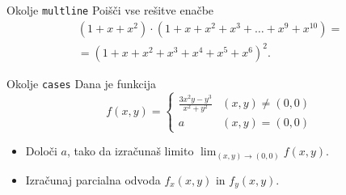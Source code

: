\begin{frame}{Okolje \texttt{multline}}
	Poišči vse rešitve enačbe
	\begin{multline*}
	(1+x+x^2) \cdot (1+x+x^2+x^3+\ldots+x^9+x^{10}) = \\
	=(1+x+x^2+x^3+x^4+x^5+x^6)^2.
	\end{multline*}
\end{frame}

\begin{frame}{Okolje \texttt{cases}}
	Dana je funkcija
	\[
	f(x,y)=\begin{cases}
		\frac{3x^2y-y^3}{x^2+y^2} & (x,y) \neq (0,0)\\
		a & (x,y) = (0,0)
	\end{cases}
	\]	
	\begin{itemize}
	\item Določi $a$, tako da izračunaš limito \( \displaystyle \lim_{(x,y)\to(0,0)} f(x,y). \)
	\item Izračunaj parcialna odvoda $f_x(x,y)$ in $f_y(x,y)$.
	\end{itemize}
\end{frame}
